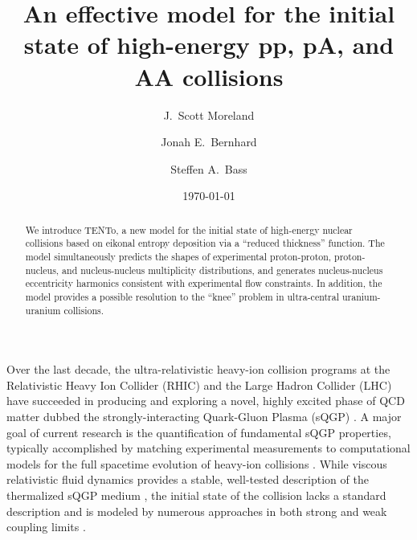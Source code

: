 \documentclass[aps,prc,reprint,amsmath,nofootinbib]{revtex4-1}
\newcommand{\trento}{T\raisebox{-.5ex}{R}ENTo}
\begin{document}
\title{An effective model for the initial state of high-energy pp, pA, and AA collisions}

\author{J.\ Scott Moreland}
\author{Jonah E.\ Bernhard}
\author{Steffen A.\ Bass}

\date{\today}


\begin{abstract}
  We introduce \trento, a new model for the initial state of high-energy nuclear collisions based on eikonal entropy deposition via a ``reduced thickness'' function.
  The model simultaneously predicts the shapes of experimental proton-proton, proton-nucleus, and nucleus-nucleus multiplicity distributions, and generates nucleus-nucleus eccentricity harmonics consistent with experimental flow constraints.
  In addition, the model provides a possible resolution to the ``knee'' problem in ultra-central uranium-uranium collisions.
\end{abstract}


\maketitle


Over the last decade, the ultra-relativistic heavy-ion collision programs at the Relativistic Heavy Ion Collider (RHIC) and the Large Hadron Collider (LHC) have succeeded in producing and exploring a novel, highly excited phase of QCD matter dubbed the strongly-interacting Quark-Gluon Plasma (sQGP)
\cite{Arsene:2004fa,Adcox:2004mh,Back:2004je,Adams:2005dq,Gyulassy:2004zy,Muller:2006ee,Muller:2012zq}.
A major goal of current research is the quantification of fundamental sQGP properties, typically accomplished by matching experimental measurements to computational models for the full spacetime evolution of heavy-ion collisions \cite{Petersen:2010zt,Novak:2013bqa}.
While viscous relativistic fluid dynamics provides a stable, well-tested description of the thermalized sQGP medium \cite{Baier:2006gy,Song:2007ux,Luzum:2008cw,Schenke:2010rr,Shen:2011eg,Shen:2014vra}, the initial state of the collision lacks a standard description and is modeled by numerous approaches in both strong and weak coupling limits \cite{Schenke:2012wb,vanderSchee:2013pia,Berges:2014yta,Kurkela:2014tea}.
\end{document}
